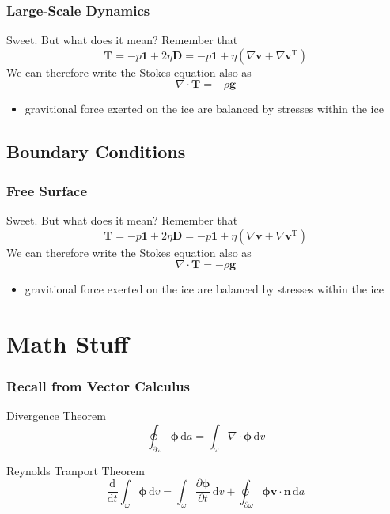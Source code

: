 \documentclass[hide notes,intlimits]{beamer}
\begin{document}
\begin{frame}
  \frametitle{Large-Scale Dynamics}
  Sweet. But what does it mean?
  Remember that 
  \begin{equation*}\mathbf{T} =  -p\mathbf{1} + 2\eta \mathbf{D} = -p\mathbf{1} + \eta\left(\nabla \mathbf{v} + \nabla \mathbf{v}^{\text{T}}\right)
  \end{equation*}
  We can therefore write the Stokes equation also as
 \begin{equation*}
    \nabla \cdot \mathbf{T} = - \rho \mathbf{g}
  \end{equation*}
  \begin{itemize}
    \item gravitional force exerted on the ice are balanced by stresses within the ice
  \end{itemize}
\end{frame}


\subsection{Boundary Conditions}


\begin{frame}
  \frametitle{Free Surface}
  Sweet. But what does it mean?
  Remember that 
  \begin{equation*}\mathbf{T} =  -p\mathbf{1} + 2\eta \mathbf{D} = -p\mathbf{1} + \eta\left(\nabla \mathbf{v} + \nabla \mathbf{v}^{\text{T}}\right)
  \end{equation*}
  We can therefore write the Stokes equation also as
 \begin{equation*}
    \nabla \cdot \mathbf{T} = - \rho \mathbf{g}
  \end{equation*}
  \begin{itemize}
    \item gravitional force exerted on the ice are balanced by stresses within the ice
  \end{itemize}
\end{frame}


\section{Math Stuff}

\begin{frame}
  \frametitle{Recall from Vector Calculus}
  \begin{block}{Divergence Theorem}
    \begin{equation}
      \oint_{\partial \omega} \boldsymbol{\phi} \,\text{d}a = 
      \int_{\omega} \nabla \cdot \boldsymbol{\phi} \, \text{d} v
    \end{equation}
  \end{block}
  \begin{block}{Reynolds Tranport Theorem}
    \begin{equation}
     \frac{\text{d}}{\text{d} t}\int_{\omega} \boldsymbol{\phi}\, \text{d} v =
     \int_{\omega} \frac{\partial \boldsymbol{\phi}}{\partial{t}} \, \text{d} v +
      \oint_{\partial \omega} \boldsymbol{\phi} \mathbf{v}\cdot\mathbf{n}\,\text{d}a 
    \end{equation}
  \end{block}
\end{frame}
\end{document}
